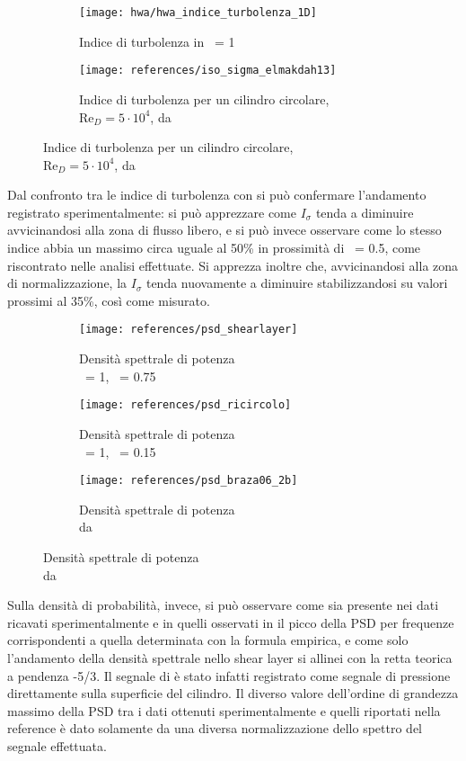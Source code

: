\documentclass{article} %
\newcommand{\xd}{\nicefrac{\textrm{x}}{\textrm{D}}\ }
\newcommand{\yd}{\nicefrac{\textrm{y}}{\textrm{D}}\ }
\begin{document}
\begin{figure}[ht!]
	\centering
	\begin{subfigure}{0.4\textwidth}
		\texttt{[image: hwa/hwa\_indice\_turbolenza\_1D]}
		\caption{Indice di turbolenza in \xd = 1}
	\end{subfigure}
	\quad
	\begin{subfigure}{0.4\textwidth}
		\texttt{[image: references/iso\_sigma\_elmakdah13]}
		\caption{Indice di turbolenza per un cilindro circolare,\\Re$_D = 5\cdot 10^4$, da \cite[fig. 5b]{elmakdah13}}
	\end{subfigure}
\end{figure}
Dal confronto tra le indice di turbolenza con \cite{elmakdah13} si può confermare l'andamento registrato sperimentalmente: si può apprezzare come $I_{\sigma}$ tenda a diminuire avvicinandosi alla zona di flusso libero, e si può invece osservare come lo stesso indice abbia un massimo circa uguale al 50\% in prossimità di \yd = 0.5, come riscontrato nelle analisi effettuate. Si apprezza inoltre che, avvicinandosi alla zona di normalizzazione, la $I_\sigma$ tenda nuovamente a diminuire stabilizzandosi su valori prossimi al 35\%, così come misurato.\par
\begin{figure}[ht!]
	\centering
	\begin{subfigure}{0.3\textwidth}
		\texttt{[image: references/psd\_shearlayer]}
		\caption{Densità spettrale di potenza\\\xd = 1, \yd = 0.75}
	\end{subfigure}
	\begin{subfigure}{0.3\textwidth}
		\texttt{[image: references/psd\_ricircolo]}
		\caption{Densità spettrale di potenza\\\xd = 1, \yd = 0.15}
	\end{subfigure}
	\begin{subfigure}{0.3\textwidth}
		\texttt{[image: references/psd\_braza06\_2b]}
		\caption{Densità spettrale di potenza\\da \cite[fig.~2b]{braza06}}
	\end{subfigure}
\end{figure}\par
Sulla densità di probabilità, invece, si può osservare come sia presente nei dati ricavati sperimentalmente e in quelli osservati in \cite{braza06} il picco della PSD per frequenze corrispondenti a quella determinata con la formula empirica, e come solo l'andamento della densità spettrale nello shear layer si allinei con la retta teorica a pendenza -5/3. Il segnale di \cite{braza06} è stato infatti registrato come segnale di pressione direttamente sulla superficie del cilindro. Il diverso valore dell'ordine di grandezza massimo della PSD tra i dati ottenuti sperimentalmente e quelli riportati nella reference è dato solamente da una diversa normalizzazione dello spettro del segnale effettuata.\par
\end{document}
